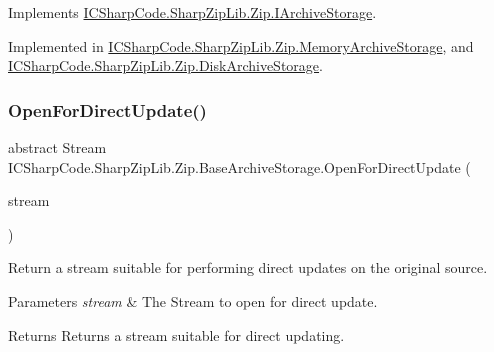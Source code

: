 Implements \hyperlink{interface_i_c_sharp_code_1_1_sharp_zip_lib_1_1_zip_1_1_i_archive_storage_a90dfbf17d7fd1a9ab9beb7a0b66b8678}{I\+C\+Sharp\+Code.\+Sharp\+Zip\+Lib.\+Zip.\+I\+Archive\+Storage}.



Implemented in \hyperlink{class_i_c_sharp_code_1_1_sharp_zip_lib_1_1_zip_1_1_memory_archive_storage_aba8d53a76aa47b36feefb4e42a98b4d3}{I\+C\+Sharp\+Code.\+Sharp\+Zip\+Lib.\+Zip.\+Memory\+Archive\+Storage}, and \hyperlink{class_i_c_sharp_code_1_1_sharp_zip_lib_1_1_zip_1_1_disk_archive_storage_abe8267ae880501446aa0892c8f93a657}{I\+C\+Sharp\+Code.\+Sharp\+Zip\+Lib.\+Zip.\+Disk\+Archive\+Storage}.

\mbox{\label{class_i_c_sharp_code_1_1_sharp_zip_lib_1_1_zip_1_1_base_archive_storage_a2e718c69eceae215d38d997e7b0d3693}} 
\subsubsection{\texorpdfstring{Open\+For\+Direct\+Update()}{OpenForDirectUpdate()}}
{\footnotesize\ttfamily abstract Stream I\+C\+Sharp\+Code.\+Sharp\+Zip\+Lib.\+Zip.\+Base\+Archive\+Storage.\+Open\+For\+Direct\+Update (\begin{DoxyParamCaption}\item[{Stream}]{stream }\end{DoxyParamCaption})\hspace{0.3cm}{\ttfamily [pure virtual]}}



Return a stream suitable for performing direct updates on the original source. 


\begin{DoxyParams}{Parameters}
{\em stream} & The Stream to open for direct update.\\
\hline
\end{DoxyParams}
\begin{DoxyReturn}{Returns}
Returns a stream suitable for direct updating.
\end{DoxyReturn}


